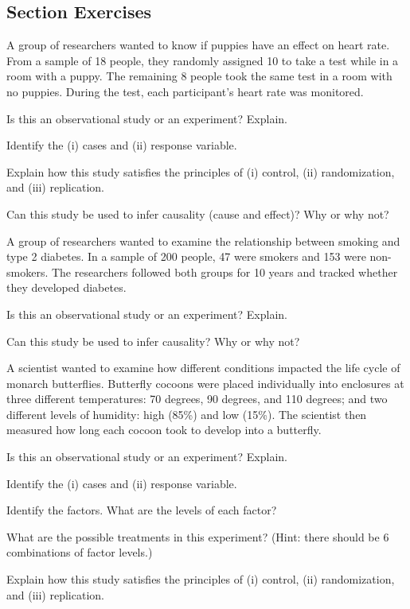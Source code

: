 \documentclass[
]{book}
\begin{document}
\subsection*{Section Exercises}\label{section-exercises-2}

A group of researchers wanted to know if puppies have an effect on heart rate. From a sample of 18 people, they randomly assigned 10 to take a test while in a room with a puppy. The remaining 8 people took the same test in a room with no puppies. During the test, each participant's heart rate was monitored.

Is this an observational study or an experiment? Explain.

Identify the (i) cases and (ii) response variable.

Explain how this study satisfies the principles of (i) control, (ii) randomization, and (iii) replication.

Can this study be used to infer causality (cause and effect)? Why or why not?

A group of researchers wanted to examine the relationship between smoking and type 2 diabetes. In a sample of 200 people, 47 were smokers and 153 were non-smokers. The researchers followed both groups for 10 years and tracked whether they developed diabetes.

Is this an observational study or an experiment? Explain.

Can this study be used to infer causality? Why or why not?

A scientist wanted to examine how different conditions impacted the life cycle of monarch butterflies. Butterfly cocoons were placed individually into enclosures at three different temperatures: 70 degrees, 90 degrees, and 110 degrees; and two different levels of humidity: high (85\%) and low (15\%). The scientist then measured how long each cocoon took to develop into a butterfly.

Is this an observational study or an experiment? Explain.

Identify the (i) cases and (ii) response variable.

Identify the factors. What are the levels of each factor?

What are the possible treatments in this experiment? (Hint: there should be 6 combinations of factor levels.)

Explain how this study satisfies the principles of (i) control, (ii) randomization, and (iii) replication.
\end{document}
